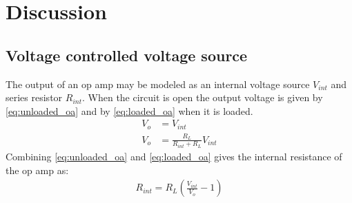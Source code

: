 \section{Discussion}\label{sec:discussion}

\subsection{Voltage controlled voltage source}\label{sec:vcvs}
The output of an op amp may be modeled as an internal voltage source $V_{int}$ and series resistor $R_{int}$.
When the circuit is open the output voltage is given by \eqref{eq:unloaded_oa} and by \eqref{eq:loaded_oa} when it is loaded.
\begin{align}
V_o &= V_{int} \label{eq:unloaded_oa} \\
V_o &= \frac{R_L}{R_{int} + R_L}V_{int} \label{eq:loaded_oa}
\end{align}
Combining \eqref{eq:unloaded_oa} and \eqref{eq:loaded_oa} gives the internal resistance of the op amp as:
\begin{align}
R_{int} = R_L \left( \frac{V_{int}}{V_o} - 1 \right)
\end{align}

